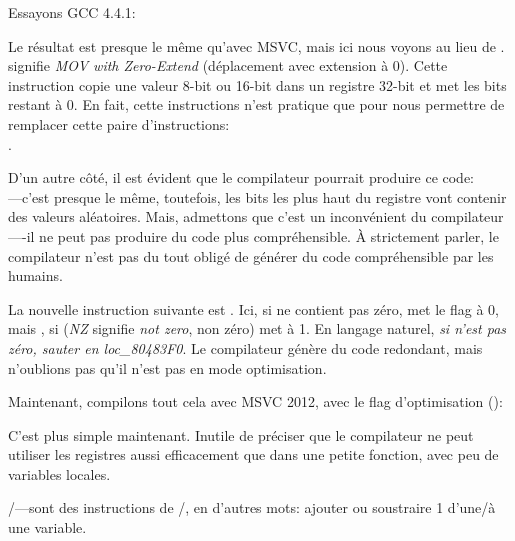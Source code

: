 Essayons GCC 4.4.1:



\label{movzx}

Le résultat est presque le même qu'avec MSVC, mais ici nous voyons \MOVZX au lieu
de \MOVSX.
\MOVZX signifie \emph{MOV with Zero-Extend} (déplacement avec extension à 0).
Cette instruction copie une valeur 8-bit ou 16-bit dans un registre 32-bit et met
les bits restant à 0.
En fait, cette instructions n'est pratique que pour nous permettre de remplacer cette
paire d'instructions:\\
.

D'un autre côté, il est évident que le compilateur pourrait produire ce code: \\
---c'est presque le même, toutefois, les
bits les plus haut du registre \EAX vont contenir des valeurs aléatoires.
Mais, admettons que c'est un inconvénient du compilateur----il ne peut pas produire
du code plus compréhensible. À strictement parler, le compilateur n'est pas du tout
obligé de générer du code compréhensible par les humains.


La nouvelle instruction suivante est \SETNZ.
Ici, si \AL ne contient pas zéro,  met le flag \ZF à 0, mais \SETNZ,
si  (\emph{NZ} signifie \emph{not zero}, non zéro) met \AL à 1. En langage
naturel, \emph{si \AL n'est pas zéro, sauter en loc\_80483F0}. Le compilateur génère
du code redondant, mais n'oublions pas qu'il n'est pas en mode optimisation.

\label{strlen_MSVC_Ox}

Maintenant, compilons tout cela avec MSVC 2012, avec le flag d'optimisation (\Ox):



C'est plus simple maintenant. Inutile de préciser que le compilateur ne peut utiliser
les registres aussi efficacement que dans une petite fonction, avec peu de variables
locales.

\INC/\DEC---sont des instructions de /,
en d'autres mots: ajouter ou soustraire 1 d'une/à une variable.

